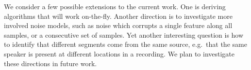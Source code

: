 We consider a few possible extensions to the current work. One is deriving algorithms that will work on-the-fly. Another direction is to investigate more involved noise models, such as noise which corrupts a single feature along all samples, or a consecutive set of samples. Yet another interesting question is how to identify that different segments come from the same source, e.g.\ that the same speaker is present at different locations in a recording. We plan to investigate these directions in future work.
%
